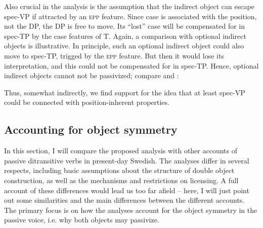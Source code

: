 \documentclass[output=paper]{langscibook}
\begin{document}
Also crucial in the analysis is the assumption that the indirect object can escape spec-VP if attracted by an \textsc{epp} feature. Since case is associated with the position, not the DP, the DP is free to move. Its “lost” case will be compensated for in spec-TP by the case features of T. Again, a comparison with optional indirect objects is illustrative. In principle, such an optional indirect object could also move to spec-TP, trigged by the \textsc{epp} feature. But then it would lose its interpretation, and this could not be compensated for in spec-TP. Hence, optional indirect objects cannot not be passivized; compare  and :


\ea%
    \label{ex:falk:23}

\z
\z

Thus, somewhat indirectly, we find support for the idea that at least spec-VP could be connected with position-inherent properties.

\subsection{Accounting for object symmetry}\label{sec:falk:4.5}


In this section, I will compare the proposed analysis with other accounts of passive ditransitive verbs in present-day Swedish. The analyses differ in several respects, including basic assumptions about the structure of double object construction, as well as the mechanisms and restrictions on licensing. A full account of these differences would lead us too far afield – here, I will just point out some similarities and the main differences between the different accounts. The primary focus is on how the analyses account for the object symmetry in the passive voice, i.e. why both objects may passivize.
\end{document}
